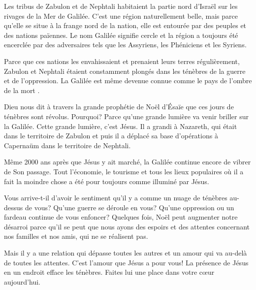 

Les tribus de Zabulon et de Nephtali habitaient la partie nord d'Israël sur les rivages de la Mer de Galilée. C'est une région naturellement belle, mais parce qu'elle se situe à la frange nord de la nation, elle est entourée par des peuples et des nations païennes. Le nom \og Galilée \fg{} signifie \og cercle \fg{} et la région a toujours été encerclée par des adversaires tels que les Assyriens, les Phéniciens et les Syriens.

Parce que ces nations les envahissaient et prenaient leurs terres régulièrement, Zabulon et Nephtali étaient constamment plongés dans les ténèbres de la guerre et de l'oppression. La Galilée est même devenue connue comme \og le pays de l'ombre de la mort \fg{}.

Dieu nous dit à travers la grande prophétie de Noël d'Ésaïe que ces jours de ténèbres sont révolus. Pourquoi? Parce qu'une grande lumière va venir briller sur la Galilée. Cette grande lumière, c'est Jésus. Il a grandi à Nazareth, qui était dans le territoire de Zabulon et puis il a déplacé sa base d'opérations à Capernaüm dans le territoire de Nephtali.

Même 2000 ans après que Jésus y ait marché, la Galilée continue encore de vibrer de Son passage. Tout \ocadr l'économie, le tourisme et tous les lieux populaires où il a fait la moindre chose \fcadr{} a été pour toujours comme illuminé par Jésus.

Vous arrive-t-il d'avoir le sentiment qu'il y a comme un nuage de ténèbres au-dessus de vous? Qu'une guerre se déroule en vous? Qu'une oppression ou un fardeau continue de vous enfoncer? Quelques fois, Noël peut augmenter notre désarroi parce qu'il se peut que nous ayons des espoirs et des attentes concernant nos familles et nos amis, qui ne se réalisent pas.

Mais il y a une relation qui dépasse toutes les autres et un amour qui va au-delà de toutes les attentes. C'est l'amour que Jésus a pour vous! La présence de Jésus en un endroit efface les ténèbres. Faites lui une place dans votre cœur aujourd'hui.



